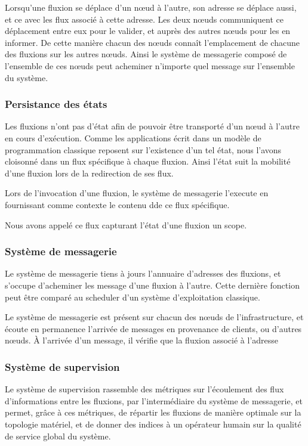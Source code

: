 	Lorsqu'une fluxion se déplace d'un nœud à l'autre, son adresse se déplace aussi, et ce avec les flux associé à cette adresse.
	Les deux nœuds communiquent ce déplacement entre eux pour le valider, et auprès des autres nœuds pour les en informer.
	De cette manière chacun des nœuds connaît l'emplacement de chacune des fluxions sur les autres nœuds.
	Ainsi le système de messagerie composé de l'ensemble de ces nœuds peut acheminer n'importe quel message sur l'ensemble du système.

	\subsubsection{Persistance des états}

	Les fluxions n'ont pas d'état afin de pouvoir être transporté d'un nœud à l'autre en cours d'exécution. Comme les applications écrit dans un modèle de programmation classique reposent sur l'existence d'un tel état, nous l'avons cloisonné dans un flux spécifique à chaque fluxion. Ainsi l'état suit la mobilité d'une fluxion lors de la redirection de ses flux.

	Lors de l'invocation d'une fluxion, le système de messagerie l'execute en fournissant comme contexte le contenu dde ce flux spécifique.

	Nous avons appelé ce flux capturant l'état d'une fluxion un scope.

	\subsubsection{Système de messagerie}

	Le système de messagerie tiens à jours l'annuaire d'adresses des fluxions, et s'occupe d'acheminer les message d'une fluxion à l'autre.
	Cette dernière fonction peut être comparé au scheduler d'un système d'exploitation classique.

	Le système de messagerie est présent sur chacun des nœuds de l'infrastructure, et écoute en permanence l'arrivée de messages en provenance de clients, ou d'autres nœuds.
	À l'arrivée d'un message, il vérifie que la fluxion associé à l'adresse 


	\subsubsection{Système de supervision}

	Le système de supervision rassemble des métriques sur l'écoulement des flux d'informations entre les fluxions, par l'intermédiaire du système de messagerie, et permet, grâce à ces métriques, de répartir les fluxions de manière optimale sur la topologie matériel, et de donner des indices à un opérateur humain sur la qualité de service global du système.

